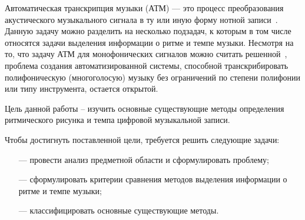 
Автоматическая транскрипция музыки (АТМ) — это процесс преобразования акустического музыкального сигнала в ту или иную форму нотной записи~\cite{future_dir}. Данную задачу можно разделить на несколько подзадач, к которым в том числе относятся задачи выделения информации о ритме и темпе музыки. Несмотря на то, что задачу АТМ для монофонических сигналов можно считать решенной~\cite{future_dir}, проблема создания автоматизированной системы, способной транскрибировать полифоническую (многоголосую) музыку без ограничений по степени полифонии или типу инструмента, остается открытой.

Цель данной работы – изучить основные существующие методы определения ритмического рисунка и темпа цифровой музыкальной записи.

Чтобы достигнуть поставленной цели, требуется решить следующие задачи:
\begin{itemize}
	\item[---] провести анализ предметной области и сформулировать проблему;
	\item[---] сформулировать критерии сравнения методов выделения информации о ритме и темпе музыки;
	\item[---] классифицировать основные существующие методы.
\end{itemize}